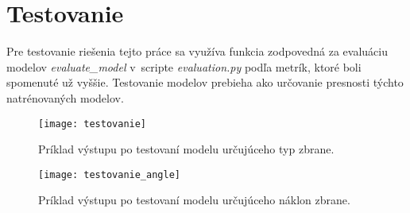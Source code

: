 
\section{Testovanie}
\label{sec:testovanie}
Pre testovanie riešenia tejto práce sa využíva funkcia zodpovedná za evaluáciu modelov \textit{evaluate\_model} v~scripte \textit{evaluation.py}
    podľa metrík, ktoré boli spomenuté už vyššie.
Testovanie modelov prebieha ako určovanie presnosti týchto natrénovaných modelov.

\begin{figure}[H]
    \centering
    \texttt{[image: testovanie]}
    \caption{Príklad výstupu po testovaní modelu určujúceho typ zbrane.}
    \label{pic:testovanie}
\end{figure}

\begin{figure}[H]
    \centering
    \texttt{[image: testovanie\_angle]}
    \caption{Príklad výstupu po testovaní modelu určujúceho náklon zbrane.}
    \label{pic:testovanie}
\end{figure}
